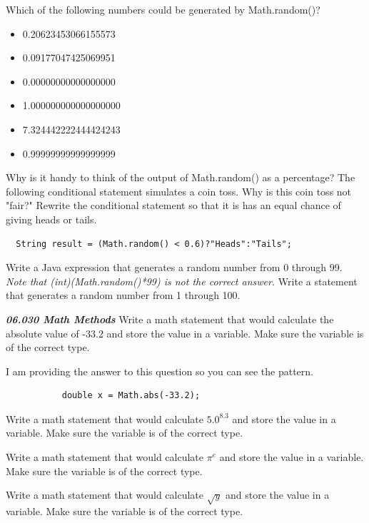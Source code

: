 \documentclass[letterpaper,11pt]{exam}
\newcommand{\videoheading}[1]{\Large\textbf{\textit{#1}}}
\begin{document}
\begin{questions}
\question Which of the following numbers could be generated by Math.random()?
\begin{itemize}
  \item  0.20623453066155573
  \item  0.09177047425069951
  \item  0.00000000000000000
  \item 1.000000000000000000
  \item 7.324442222444424243
  \item  0.99999999999999999
\end{itemize}
\question Why is it handy to think of the output of Math.random() as a percentage?
\question The following conditional statement simulates a coin toss.  Why is this coin toss not "fair?"  Rewrite the conditional statement so that it is has an equal chance of giving heads or tails.
\begin{verbatim}
  String result = (Math.random() < 0.6)?"Heads":"Tails";
\end{verbatim}
\vspace{1cm}
\question Write a Java expression that generates a random number from 0 through 99.\\  \textit{Note that (int)(Math.random()*99) is not the correct answer.}
\vspace{1cm}
\question Write a statement that generates a random number from 1 through 100.
\vspace{1cm}

\videoheading{06.030 Math Methods}
\question Write a math statement that would calculate the absolute value of -33.2 and store the value in a variable.  Make sure the variable is of the correct type.

\color{cyan}I am providing the answer to this question so you can see the pattern.
\color{blue}
\begin{verbatim}
           double x = Math.abs(-33.2);
\end{verbatim}
\color{black}

\question Write a math statement that would calculate ${5.0}^{8.3}$ and store the value in a variable.  Make sure the variable is of the correct type.
\vspace{1cm}

\question Write a math statement that would calculate $\pi^e$ and store the value in a variable.  Make sure the variable is of the correct type.
\vspace{1cm}

\question Write a math statement that would calculate $\sqrt{y}$ and store the value in a variable.  Make sure the variable is of the correct type.
\vspace{1cm}


\end{questions}
\end{document}
